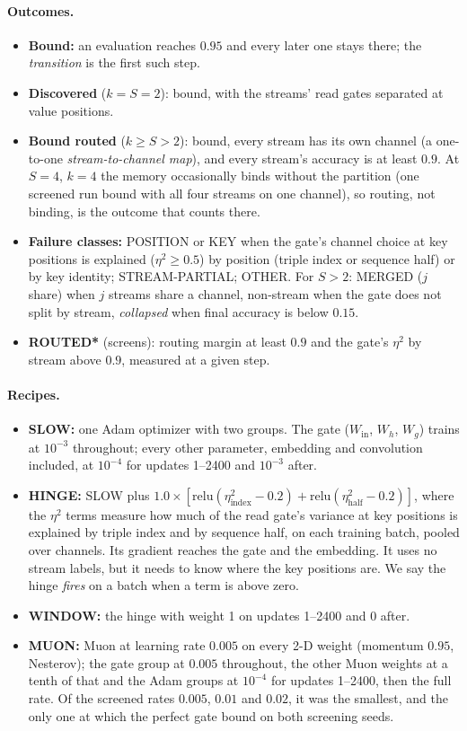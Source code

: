 \documentclass[11pt]{article}
\begin{document}
\paragraph{Outcomes.}
\begin{itemize}
\item \textbf{Bound:} an evaluation reaches $0.95$ and every later one stays there; the \emph{transition} is the first such step.
\item \textbf{Discovered} ($k = S = 2$): bound, with the streams' read gates separated at value positions.
\item \textbf{Bound routed} ($k \geq S > 2$): bound, every stream has its own channel (a one-to-one \emph{stream-to-channel map}), and every stream's accuracy is at least $0.9$. At $S = 4$, $k = 4$ the memory occasionally binds without the partition (one screened run bound with all four streams on one channel), so routing, not binding, is the outcome that counts there.
\item \textbf{Failure classes:} POSITION or KEY when the gate's channel choice at key positions is explained ($\eta^2 \geq 0.5$) by position (triple index or sequence half) or by key identity; STREAM-PARTIAL; OTHER. For $S > 2$: MERGED ($j$ share) when $j$ streams share a channel, non-stream when the gate does not split by stream, \emph{collapsed} when final accuracy is below $0.15$.
\item \textbf{ROUTED*} (screens): routing margin at least $0.9$ and the gate's $\eta^2$ by stream above $0.9$, measured at a given step.
\end{itemize}

\paragraph{Recipes.}
\begin{itemize}
\item \textbf{SLOW:} one Adam optimizer with two groups. The gate ($W_{\mathrm{in}}$, $W_h$, $W_g$) trains at $10^{-3}$ throughout; every other parameter, embedding and convolution included, at $10^{-4}$ for updates 1--2400 and $10^{-3}$ after.
\item \textbf{HINGE:} SLOW plus $1.0 \times [\mathrm{relu}(\eta^2_{\mathrm{index}} - 0.2) + \mathrm{relu}(\eta^2_{\mathrm{half}} - 0.2)]$, where the $\eta^2$ terms measure how much of the read gate's variance at key positions is explained by triple index and by sequence half, on each training batch, pooled over channels. Its gradient reaches the gate and the embedding. It uses no stream labels, but it needs to know where the key positions are. We say the hinge \emph{fires} on a batch when a term is above zero.
\item \textbf{WINDOW:} the hinge with weight 1 on updates 1--2400 and 0 after.
\item \textbf{MUON:} Muon at learning rate $0.005$ on every 2-D weight (momentum $0.95$, Nesterov); the gate group at $0.005$ throughout, the other Muon weights at a tenth of that and the Adam groups at $10^{-4}$ for updates 1--2400, then the full rate. Of the screened rates $0.005$, $0.01$ and $0.02$, it was the smallest, and the only one at which the perfect gate bound on both screening seeds.
\end{itemize}
\end{document}
